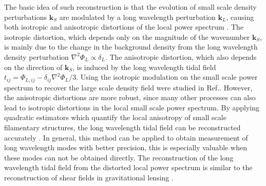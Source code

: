 \documentclass[aps,prd,twocolumn,showpacs,superscriptaddress,groupedaddress,nofootinbib]{revtex4}  %
\begin{document}
The basic idea of such reconstruction is that the evolution of 
small scale density perturbations $\bm{k}_S$ are modulated by a long
wavelength perturbation $\bm{k}_L$, causing both isotropic and anisotropic
distortions of the local power spectrum \cite{2014:tidal}. 
The isotropic distortion, which depends only on the magnitude of the 
wavenumber $\bm{k}_S$, is mainly due to the change in the background density 
from the long wavelength density perturbation $\nabla^2\Phi_{L}\propto\delta_L$.
The anisotropic distortion, which also depends on the direction of $\bm{k}_S$,
is induced by the long wavelength tidal field 
$t_{ij}=\Phi_{L,ij}-\delta_{ij}\nabla^2\Phi_{L}/3$.
Using the isotropic modulation on the small scale power spectrum to recover
the large scale density field were studied in Ref.\cite{2014li}.
However, the anisotropic distortions are more robust, since many other 
processes can also lead to isotropic distortions in the local small scale 
power spectrum. By applying quadratic estimators which quantify the local 
anisotropy of small scale filamentary structures, the long wavelength 
tidal field can be reconstructed accurately \cite{2012:pen}.
In general, this method can be applied to obtain measurement of long wavelength 
modes with better precision, this is especially valuable when these modes can not be 
obtained directly. 
The reconstruction of the long wavelength tidal field from the distorted local 
power spectrum is similar to the reconstruction of 
shear fields in gravitational lensing \cite{2008:lu,2010lu}.
\end{document}
